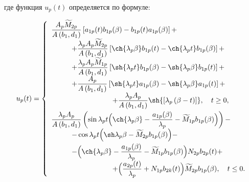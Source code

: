 где функция $u_{p}(t)$ определяется по формуле:

\begin{equation}\label{arkhip:eq25}

u_{p} (t) = \left\{ \begin{array} {l}

\displaystyle

\frac{A_{p}\widetilde M_{2 p}}{A\left(b_{1}, d_{1}\right)}\left[a_{1p} (t)b_{1 p}(\beta) - b_{1 p}(t)a_{1 p} (\beta)\right] + \\[2mm]

\displaystyle \hspace{1cm}

 + \frac{\lambda_{p}A_{p}\widetilde M_{2 p}}{A\left(b_{1}, d_{1}\right)}\left[\ch{\lambda_{p} \beta}b_{1 p}(t) -\ch{\lambda_{p} t}b_{1 p}(\beta)\right] + \\[2mm]

\displaystyle \hspace{1cm}

 + \frac{\lambda_{p}A_{p}\widetilde M_{1 p}}{A\left(b_{1}, d_{1}\right)}\left[\sh {\lambda_{p}t}b_{1 p}(\beta) - \sh {\lambda_{p}\beta}b_{1 p}(t)\right]  + \\[2mm]

 \displaystyle \hspace{1cm}

+ \frac{A_{p}}{A\left(b_{1}, d_{1}\right)}\left[\sh {\lambda_{p}t}a_{1 p}(\beta) - \sh {\lambda_{p}\beta}a_{1 p}(t)\right] + \\[2mm]

 \displaystyle \hspace{3cm} + \frac{\lambda_{p}A_{p}}{A\left(b_{1}, d_{1}\right)}\sh{\left[\lambda_{p}\left(\beta - t\right)\right]},\quad t \ge 0,\\[3mm]

  \displaystyle 

\frac{\lambda_{p}  A_{p}}{A\left(b_{1}, d_{1}\right)}\left(\sin{\lambda_{p} t}\Bigl(\ch{\lambda_{p}\beta} - \frac{a_{1p} (\beta)}{\lambda_{p}} - \widetilde M_{1 p}b_{1 p}(\beta)\Bigr)\right)  - \\[2mm]

\displaystyle \hspace{1cm}

 -\cos{\lambda_{p}t}\Bigl(\sh\lambda_{p}\beta - \widetilde M_{2 p}b_{1 p}(\beta)\Bigr) - \\[2mm]

 \displaystyle \hspace{1cm}

 - \Bigl(\ch{\lambda_{p} \beta} - \frac{a_{1 p} (\beta)}{\lambda_{p}} - \widetilde M_{1 p}b_{1 p}(\beta)\Bigr)N_{2 p}b_{2 p}(t) + \\[2mm]

  \displaystyle \hspace{3cm}

 +\Bigl( \frac{a_{2p} (t)}{\lambda_{p}} + N_{1 p}b_{2 k}(t)\Bigr)\widetilde M_{2 p}b_{1 p}(\beta) ,\quad t \le 0.\\

\end {array} \right.

\end{equation}

